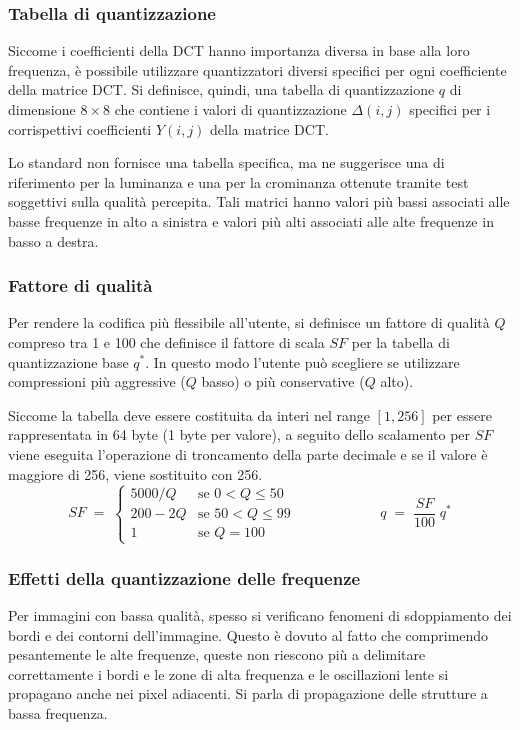\subsubsection*{Tabella di quantizzazione}
Siccome i coefficienti della DCT hanno importanza diversa in base alla loro frequenza, è possibile utilizzare quantizzatori
diversi specifici per ogni coefficiente della matrice DCT. Si definisce, quindi, una tabella di quantizzazione \(q\) di
dimensione \(8 \times 8\) che contiene i valori di quantizzazione \(\Delta(i,j)\) specifici per i corrispettivi coefficienti
\(Y(i,j)\) della matrice DCT.

Lo standard non fornisce una tabella specifica, ma ne suggerisce una di riferimento per la luminanza e una per la crominanza
ottenute tramite test soggettivi sulla qualità percepita. Tali matrici hanno valori più bassi associati alle basse frequenze
in alto a sinistra e valori più alti associati alle alte frequenze in basso a destra.

\subsubsection*{Fattore di qualità}
Per rendere la codifica più flessibile all'utente, si definisce un fattore di qualità \(Q\) compreso tra 1 e 100 che definisce
il fattore di scala \(SF\) per la tabella di quantizzazione base \(q^*\). In questo modo l'utente può scegliere se utilizzare
compressioni più aggressive (\(Q\) basso) o più conservative (\(Q\) alto).

Siccome la tabella deve essere costituita da interi nel range \([1,256]\) per essere rappresentata in 64 byte (1 byte per
valore), a seguito dello scalamento per \(SF\) viene eseguita l'operazione di troncamento della parte decimale e se il
valore è maggiore di 256, viene sostituito con 256.
\[SF \; = \; \begin{cases}
	5000 / Q & \text{se } 0 < Q \leq 50 \\
	200 - 2Q & \text{se } 50 < Q \leq 99 \\
	1 & \text{se } Q = 100
\end{cases} \qquad\qquad\qquad q \; = \; \frac{SF}{100} \; q^*\]

\subsubsection*{Effetti della quantizzazione delle frequenze}
Per immagini con bassa qualità, spesso si verificano fenomeni di sdoppiamento dei bordi e dei contorni dell'immagine.
Questo è dovuto al fatto che comprimendo pesantemente le alte frequenze, queste non riescono più a delimitare correttamente
i bordi e le zone di alta frequenza e le oscillazioni lente si propagano anche nei pixel adiacenti. Si parla di propagazione
delle strutture a bassa frequenza.

